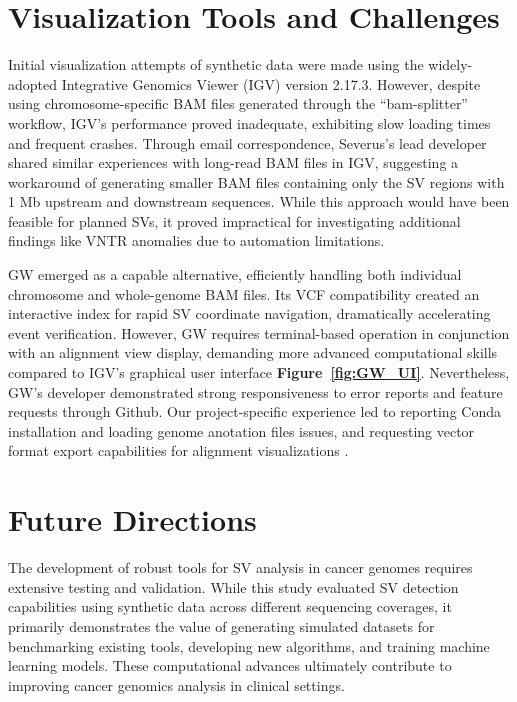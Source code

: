 \section{Visualization Tools and Challenges}

Initial visualization attempts of synthetic data were made using the 
widely-adopted Integrative Genomics Viewer (IGV) version 2.17.3. However, 
despite using chromosome-specific BAM files generated through the ``bam-splitter'' 
workflow, IGV's performance proved inadequate, exhibiting slow loading times and 
frequent crashes. Through email correspondence, Severus's lead developer shared 
similar experiences with long-read BAM files in IGV, suggesting a workaround of 
generating smaller BAM files containing only the SV regions with 1 Mb upstream 
and downstream sequences. While this approach would have been feasible for 
planned SVs, it proved impractical for investigating additional findings like 
VNTR anomalies due to automation limitations.

GW emerged as a capable alternative, efficiently handling both individual 
chromosome and whole-genome BAM files. Its VCF compatibility created an 
interactive index for rapid SV coordinate navigation, dramatically accelerating 
event verification. However, GW requires terminal-based operation in conjunction 
with an alignment view display, demanding more advanced computational skills 
compared to IGV's graphical user interface \textbf{Figure~\ref{fig:GW_UI}}. 
Nevertheless, GW's developer demonstrated strong responsiveness to error reports 
and feature requests through Github. Our project-specific experience led to 
reporting Conda installation \cite{noauthor_error_nodate} and loading genome
anotation files \cite{noauthor_display_nodate} issues, and requesting vector 
format export capabilities for alignment visualizations 
\cite{noauthor_saving_nodate}.

\section{Future Directions}

The development of robust tools for SV analysis in cancer genomes requires 
extensive testing and validation. While this study evaluated SV detection 
capabilities using synthetic data across different sequencing coverages, 
it primarily demonstrates the value of generating simulated datasets for 
benchmarking existing tools, developing new algorithms, and training machine 
learning models. These computational advances ultimately contribute to 
improving cancer genomics analysis in clinical settings.

